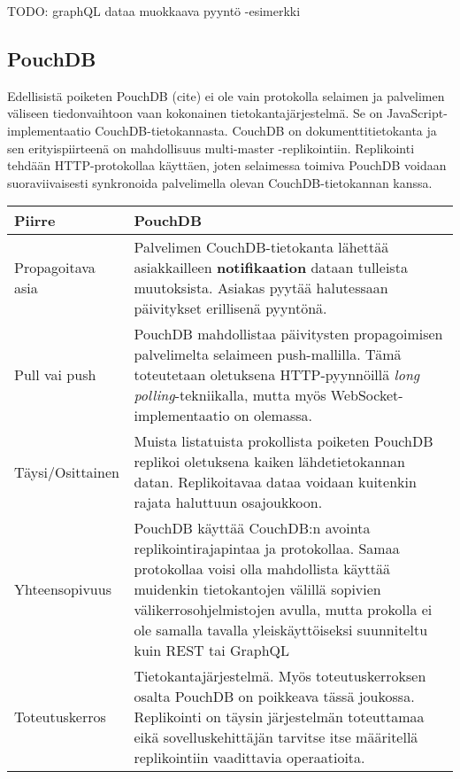 \documentclass[finnish,twoside,censored,csm,sw-track-2018]{HYthesisML}
\begin{document}
TODO: graphQL dataa muokkaava pyyntö -esimerkki

\subsection{PouchDB}

Edellisistä poiketen PouchDB (cite) ei ole vain protokolla selaimen ja palvelimen väliseen tiedonvaihtoon vaan kokonainen tietokantajärjestelmä. Se on JavaScript-implementaatio CouchDB-tietokannasta. CouchDB on dokumenttitietokanta ja sen erityispiirteenä on mahdollisuus multi-master -replikointiin. Replikointi tehdään HTTP-protokollaa käyttäen, joten selaimessa toimiva PouchDB voidaan suoraviivaisesti synkronoida palvelimella olevan CouchDB-tietokannan kanssa.

\begin{center}
\begin{tabular}{ | m{3.3cm} | m{11.7cm} | }
 \hline
 \textbf{Piirre} & \textbf{PouchDB}\\ 
 \hline
 Propagoitava asia & Palvelimen CouchDB-tietokanta lähettää asiakkailleen \textbf{notifikaation} dataan tulleista muutoksista. Asiakas pyytää halutessaan päivitykset erillisenä pyyntönä.\\
 \hline
 Pull vai push & PouchDB mahdollistaa päivitysten propagoimisen palvelimelta selaimeen push-mallilla. Tämä toteutetaan oletuksena HTTP-pyynnöillä \textit{long polling}-tekniikalla, mutta myös WebSocket-implementaatio on olemassa. \citep{pouchdb_polling}\\
 \hline
 Täysi/Osittainen & Muista listatuista prokollista poiketen PouchDB replikoi oletuksena kaiken lähdetietokannan datan. Replikoitavaa dataa voidaan kuitenkin rajata haluttuun osajoukkoon. \\
 \hline
 Yhteensopivuus & PouchDB käyttää CouchDB:n avointa replikointirajapintaa ja protokollaa. Samaa protokollaa voisi olla mahdollista käyttää muidenkin tietokantojen välillä sopivien välikerrosohjelmistojen avulla, mutta prokolla ei ole samalla tavalla yleiskäyttöiseksi suunniteltu kuin REST tai GraphQL\\
 \hline
 Toteutuskerros & Tietokantajärjestelmä. Myös toteutuskerroksen osalta PouchDB on poikkeava tässä joukossa. Replikointi on täysin järjestelmän toteuttamaa eikä sovelluskehittäjän tarvitse itse määritellä replikointiin vaadittavia operaatioita. \\
 \hline
\end{tabular}
\end{center}
\end{document}
